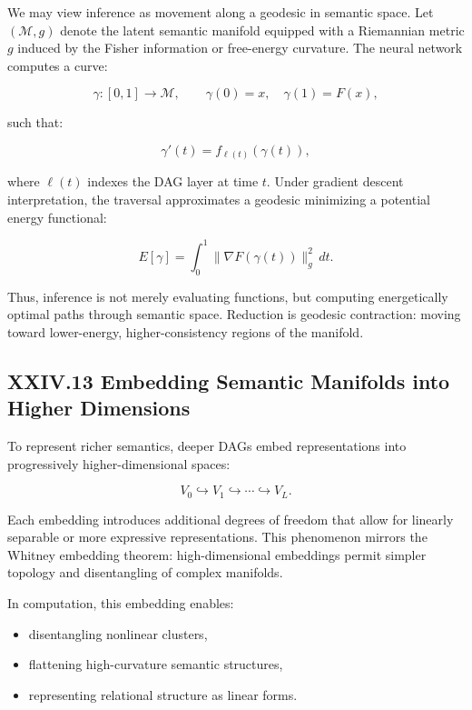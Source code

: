 \documentclass[11pt,letterpaper]{article}
\begin{document}
We may view inference as movement along a geodesic in semantic space. Let $(\mathcal{M}, g)$ denote the latent semantic manifold equipped with a Riemannian metric $g$ induced by the Fisher information or free-energy curvature. The neural network computes a curve:

\[
\gamma : [0,1] \to \mathcal{M}, \qquad \gamma(0) = x, \quad \gamma(1) = F(x),
\]

such that:

\[
\gamma'(t) = f_{\ell(t)}(\gamma(t)),
\]

where $\ell(t)$ indexes the DAG layer at time $t$. Under gradient descent interpretation, the traversal approximates a geodesic minimizing a potential energy functional:

\[
E[\gamma] = \int_0^1 \|\nabla F(\gamma(t))\|_g^2 \, dt.
\]

Thus, inference is not merely evaluating functions, but computing energetically optimal paths through semantic space.  
Reduction is geodesic contraction: moving toward lower-energy, higher-consistency regions of the manifold.

\subsection{XXIV.13 Embedding Semantic Manifolds into Higher Dimensions}

To represent richer semantics, deeper DAGs embed representations into progressively higher-dimensional spaces:

\[
V_0 \hookrightarrow V_1 \hookrightarrow \cdots \hookrightarrow V_L.
\]

Each embedding introduces additional degrees of freedom that allow for linearly separable or more expressive representations. This phenomenon mirrors the Whitney embedding theorem: high-dimensional embeddings permit simpler topology and disentangling of complex manifolds.

In computation, this embedding enables:

\begin{itemize}
    \item disentangling nonlinear clusters,
    \item flattening high-curvature semantic structures,
    \item representing relational structure as linear forms.
\end{itemize}
\end{document}
